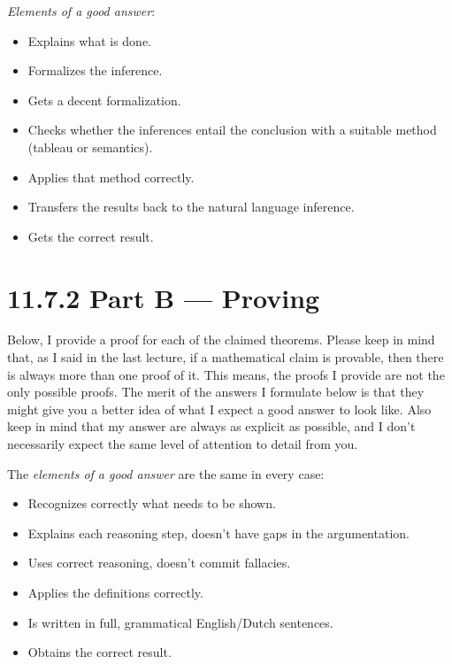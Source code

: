 \begin{itemize}
        \emph{Elements of a good answer}:

        \begin{itemize}
        \item Explains what is done.
        \item Formalizes the inference.
        \item Gets a decent formalization.
        \item Checks whether the inferences entail the conclusion with
          a suitable method (tableau or semantics).
        \item Applies that method correctly.
        \item Transfers the results back to the natural language
          inference.
        \item Gets the correct result.
        \end{itemize}
    
\end{itemize}

\section*{11.7.2 Part B --- Proving}

      Below, I provide a proof for each of the claimed
      theorems. Please keep in mind that, as I said in the last
      lecture, if a mathematical claim is provable, then there is
      always more than one proof of it. This means, the proofs I
      provide are not the only possible proofs. The merit of the%
      answers I formulate below is that they might give you a better
      idea of what I expect a good answer to look like. Also keep in
      mind that my answer are always as explicit as possible, and I
      don't necessarily expect the same level of attention to detail
      from you.
      
      The
      \emph{elements of a good answer} are the same in every case:
      \begin{itemize}
      \item Recognizes correctly what needs to be shown.
      \item Explains each reasoning step, doesn't have gaps in the
        argumentation.
      \item Uses correct reasoning, doesn't commit fallacies.
      \item Applies the definitions correctly.
      \item Is written in full, grammatical English/Dutch sentences.
      \item Obtains the correct result.
      \end{itemize}

